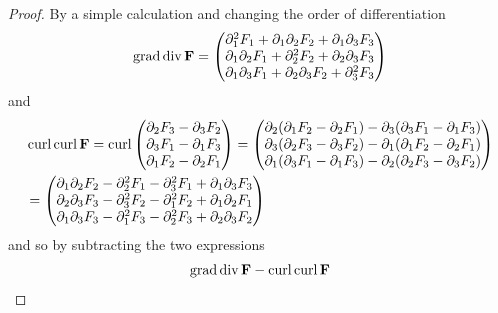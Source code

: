 \documentclass[../master_thesis.tex]{subfiles}
\begin{document}
\begin{proof}
    By a simple calculation and changing the order of differentiation
    \begin{align*}
        \operatorname{grad} \operatorname{div} \mathbf{F} = 
            \begin{pmatrix} \partial_1^2 F_1 + \partial_1 \partial_2 F_2
                + \partial_1 \partial_3 F_3
            \\ \partial_1\partial_2 F_1 + \partial_2^2 F_2 + 
                \partial_2\partial_3 F_3
            \\ \partial_1 \partial_3 F_1 + \partial_2\partial_3 F_2
                + \partial_3^2 F_3
            \end{pmatrix}
    \end{align*}
    and 
    \begin{align*}
        &\operatorname{curl} \operatorname{curl} \mathbf{F} = \operatorname{curl} \begin{pmatrix} 
            \partial_2 F_3 - \partial_3 F_2 \\ \partial_3 F_1 - \partial_1 F_3 
            \\ \partial_1 F_2 - \partial_2 F_1  \end{pmatrix}
        = \begin{pmatrix} 
            \partial_2 (\partial_1 F_2 - \partial_2 F_1)
                - \partial_3 (\partial_3 F_1 - \partial_1 F_3)
            \\ \partial_3 (\partial_2 F_3 - \partial_3 F_2)
                - \partial_1 (\partial_1 F_2 - \partial_2 F_1)
            \\ \partial_1 (\partial_3 F_1 - \partial_1 F_3)
                - \partial_2 (\partial_2 F_3 - \partial_3 F_2)  
            \end{pmatrix}
        \\ &= \begin{pmatrix}
            \partial_1 \partial_2 F_2 - \partial^2_2 F_1 - \partial_3^2 F_1
            + \partial_1 \partial_3 F_3 
            \\ \partial_2 \partial_3 F_3 - \partial^2_3 F_2 - \partial_1^2 F_2
            + \partial_1 \partial_2 F_1
            \\ \partial_1 \partial_3 F_3 - \partial^2_1 F_3 - \partial_2^2 F_3
            + \partial_2 \partial_3 F_2  
            \end{pmatrix}
    \end{align*}
    and so by subtracting the two expressions
    \begin{align*}
        \grad \diver \mathbf{F} - \curl \curl \mathbf{F}  

\end{align*}
\end{proof}
\end{document}
